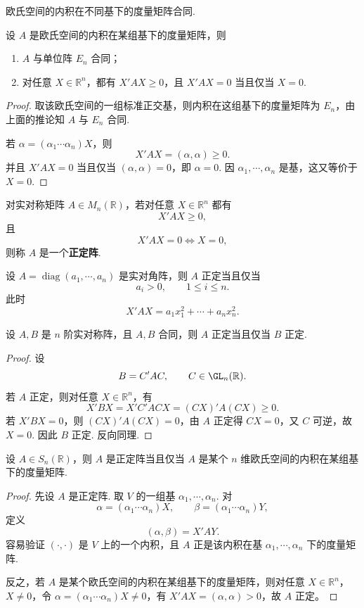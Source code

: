\begin{corollary}
	欧氏空间的内积在不同基下的度量矩阵合同.
\end{corollary}

\begin{example}
	设 $A$ 是欧氏空间的内积在某组基下的度量矩阵，则
	\begin{enumerate}
		\item $A$ 与单位阵 $E_n$ 合同；
		\item 对任意 $X\in\mathbb{R}^n$，都有 $X'AX\geqslant0$，且 $X'AX=0$ 当且仅当 $X=0$.
	\end{enumerate}
\end{example}
\begin{proof}
	取该欧氏空间的一组标准正交基，则内积在这组基下的度量矩阵为 $E_n$，由上面的推论知 $A$ 与 $E_n$ 合同.
	
	若 $\alpha=(\alpha_1\cdots\alpha_n)X$，则
	\[
	X'AX=(\alpha,\alpha)\geqslant0.
	\]
	并且 $X'AX=0$ 当且仅当 $(\alpha,\alpha)=0$，即 $\alpha=0$. 因 $\alpha_1,\cdots,\alpha_n$ 是基，这又等价于 $X=0$.
\end{proof}

\begin{definition}\label{p1:concept:c6-l698}
	对实对称矩阵 $A\in M_n(\mathbb{R})$，若对任意 $X\in\mathbb{R}^n$ 都有
	\[
	X'AX\geqslant0,
	\]
	且
	\[
	X'AX=0\Longleftrightarrow X=0,
	\]
	则称 $A$ 是一个\textbf{正定阵}.
\end{definition}

\begin{example}
	设 $A=\operatorname{diag}(a_1,\cdots,a_n)$ 是实对角阵，则 $A$ 正定当且仅当
	\[
	a_i>0,
	\qquad 1\leqslant i\leqslant n.
	\]
	此时
	\[
	X'AX=a_1x_1^2+\cdots+a_nx_n^2.
	\]
\end{example}

\begin{example}
	设 $A,B$ 是 $n$ 阶实对称阵，且 $A,B$ 合同，则 $A$ 正定当且仅当 $B$ 正定.
\end{example}
\begin{proof}
	设
	\[
	B=C'AC,
	\qquad C\in \GL_n(\mathbb{R}).
	\]
	若 $A$ 正定，则对任意 $X\in\mathbb{R}^n$，有
	\[
	X'BX=X'C'ACX=(CX)'A(CX)\geqslant0.
	\]
	若 $X'BX=0$，则 $(CX)'A(CX)=0$，由 $A$ 正定得 $CX=0$，又 $C$ 可逆，故 $X=0$. 因此 $B$ 正定. 反向同理.
\end{proof}

\begin{proposition}
	设 $A\in S_n(\mathbb{R})$，则 $A$ 是正定阵当且仅当 $A$ 是某个 $n$ 维欧氏空间的内积在某组基下的度量矩阵.
\end{proposition}
\begin{proof}
	先设 $A$ 是正定阵. 取 $V$ 的一组基 $\alpha_1,\cdots,\alpha_n$. 对
	\[
	\alpha=(\alpha_1\cdots\alpha_n)X,
	\qquad
	\beta=(\alpha_1\cdots\alpha_n)Y,
	\]
	定义
	\[
	(\alpha,\beta)=X'AY.
	\]
	容易验证 $(\cdot,\cdot)$ 是 $V$ 上的一个内积，且 $A$ 正是该内积在基 $\alpha_1,\cdots,\alpha_n$ 下的度量矩阵.
	
	反之，若 $A$ 是某个欧氏空间的内积在某组基下的度量矩阵，则对任意 $X\in\mathbb{R}^n$，$X\neq0$，令 $\alpha=(\alpha_1\cdots\alpha_n)X\neq0$，有 $X'AX=(\alpha,\alpha)>0$，故 $A$ 正定。
\end{proof}

